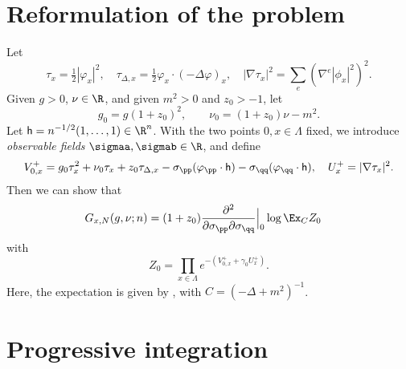 
\section{Reformulation of the problem}

Let
\begin{equation}
\tau_x = \tfrac{1}{2} |\varphi_x|^2,
  \quad
\tau_{\Delta,x} = \tfrac{1}{2} \varphi_x \cdot (-\Delta \varphi)_x,
  \quad
|\nabla\tau_x|^2 = \sum_e (\nabla^e |\phi_x|^2)^2.
\end{equation}
Given $g>0$, $\nu\in \R$, and  given $m^2>0$ and $z_0 >-1$, let
\begin{equation}
  \label{e:gg0}
  g_0 = g(1+z_0)^2, \quad \quad
  \nu_0 = (1+z_0)\nu-m^2.
\end{equation}
Let ${\sf h} = n^{-1/2}(1, \ldots, 1) \in \R^n$.
With the two points $0,x\in \Lambda$ fixed,
we introduce \emph{observable fields} $\sigmaa, \sigmab \in \R$, and define
\begin{equation}
\label{e:V0def}
  V^+_{0,x}
  = g_0\tau_x^2 + \nu_0 \tau_x + z_0 \tau_{\Delta,x} -
    \sigma_\pp (\varphi_{\pp} \cdot {\sf h})
    - \sigma_\qq (\varphi_{\qq} \cdot {\sf h}),
  \quad
  U^+_x = |\nabla \tau_x|^2.
\end{equation}
Then we can show that
\begin{align}
\label{e:generating-fn}
    G_{x,N}(g, \nu; n)
    &=
    (1+z_0)
    \frac{\partial^2 }{\partial \sigma_\pp  \partial \sigma_\qq }
    \Big|_{0}
    \log
    \Ex_C  Z_0
\end{align}
with
\begin{equation}
\label{e:Z0def}
  Z_0
  =
  \prod_{x\in \Lambda} e^{-(V^+_{0,x} + \gamma_0 U^+_x)}.
\end{equation}
Here, the expectation is given by , with $C = (-\Delta + m^2)^{-1}$.


\section{Progressive integration}
\label{sec:prog}

